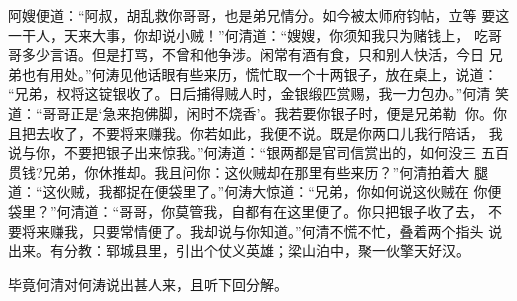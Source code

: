 阿嫂便道：“阿叔，胡乱救你哥哥，也是弟兄情分。如今被太师府钧帖，立等
要这一干人，天来大事，你却说小贼！”何清道：“嫂嫂，你须知我只为赌钱上，
吃哥哥多少言语。但是打骂，不曾和他争涉。闲常有酒有食，只和别人快活，今日
兄弟也有用处。”何涛见他话眼有些来历，慌忙取一个十两银子，放在桌上，说道：
“兄弟，权将这锭银收了。日后捕得贼人时，金银缎匹赏赐，我一力包办。”何清
笑道：“哥哥正是‘急来抱佛脚，闲时不烧香’。我若要你银子时，便是兄弟勒
你。你且把去收了，不要将来赚我。你若如此，我便不说。既是你两口儿我行陪话，
我说与你，不要把银子出来惊我。”何涛道：“银两都是官司信赏出的，如何没三
五百贯钱?兄弟，你休推却。我且问你：这伙贼却在那里有些来历？”何清拍着大
腿道：“这伙贼，我都捉在便袋里了。”何涛大惊道：“兄弟，你如何说这伙贼在
你便袋里？”何清道：“哥哥，你莫管我，自都有在这里便了。你只把银子收了去，
不要将来赚我，只要常情便了。我却说与你知道。”何清不慌不忙，叠着两个指头
说出来。有分教：郓城县里，引出个仗义英雄；梁山泊中，聚一伙擎天好汉。

毕竟何清对何涛说出甚人来，且听下回分解。